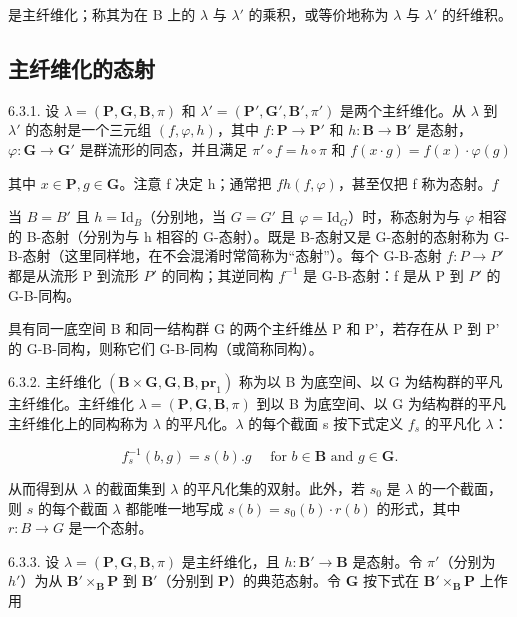 是主纤维化；称其为在 B 上的 \(\lambda\) 与 \(\lambda'\) 的乘积，或等价地称为 \(\lambda\) 与 \(\lambda'\) 的纤维积。

\subsection{主纤维化的态射}

6.3.1. 设 \(\lambda = (\mathbf{P}, \mathbf{G}, \mathbf{B}, \pi)\) 和 \(\lambda' = (\mathbf{P}', \mathbf{G}', \mathbf{B}', \pi')\) 是两个主纤维化。从 \(\lambda\) 到 \(\lambda'\) 的态射是一个三元组 \((f, \varphi, h)\)，其中 \(f: \mathbf{P} \to \mathbf{P}'\) 和 \(h: \mathbf{B} \to \mathbf{B}'\) 是态射，\(\varphi: \mathbf{G} \to \mathbf{G}'\) 是群流形的同态，并且满足 \(\pi' \circ f = h \circ \pi\) 和 \(f(x \cdot g) = f(x) \cdot \varphi(g)\)

其中 \(x \in \mathbf{P}, g \in \mathbf{G}\)。注意 f 决定 h；通常把 \(f\)\(h\)\((f, \varphi)\)，甚至仅把 f 称为态射。\(f\)

当 \(B = B'\) 且 \(h = \mathrm{Id}_{B}\)（分别地，当 \(G = G'\) 且 \(\varphi = \mathrm{Id}_{G}\)）时，称态射为与 \(\varphi\) 相容的 B-态射（分别为与 h 相容的 G-态射）。既是 B-态射又是 G-态射的态射称为 G-B-态射（这里同样地，在不会混淆时常简称为“态射”）。每个 G-B-态射 \(f : P \to P'\) 都是从流形 P 到流形 \(P'\) 的同构；其逆同构 \(f^{-1}\) 是 G-B-态射：f 是从 P 到 \(P'\) 的 G-B-同构。

具有同一底空间 B 和同一结构群 G 的两个主纤维丛 P 和 P'，若存在从 P 到 P' 的 G-B-同构，则称它们 G-B-同构（或简称同构）。

6.3.2. 主纤维化 \((\mathbf{B} \times \mathbf{G}, \mathbf{G}, \mathbf{B}, \mathbf{pr}_{1})\) 称为以 B 为底空间、以 G 为结构群的平凡主纤维化。主纤维化 \(\lambda = (\mathbf{P}, \mathbf{G}, \mathbf{B}, \pi)\) 到以 B 为底空间、以 G 为结构群的平凡主纤维化上的同构称为 \(\lambda\) 的平凡化。\(\lambda\) 的每个截面 s 按下式定义 \(f_{s}\) 的平凡化 \(\lambda\)：

\[
f _ {s} ^ {- 1} (b, g) = s (b). g \quad \text {   for   } b \in \mathbf {B} \text {   and   } g \in \mathbf {G}.
\]

从而得到从 \(\lambda\) 的截面集到 \(\lambda\) 的平凡化集的双射。此外，若 \(s_0\) 是 \(\lambda\) 的一个截面，则 \(s\) 的每个截面 \(\lambda\) 都能唯一地写成 \(s(b) = s_0(b) \cdot r(b)\) 的形式，其中 \(r: B \to G\) 是一个态射。

6.3.3. 设 \(\lambda = (\mathbf{P}, \mathbf{G}, \mathbf{B}, \pi)\) 是主纤维化，且 \(h: \mathbf{B}' \to \mathbf{B}\) 是态射。令 \(\pi'\)（分别为 \(h'\)）为从 \(\mathbf{B}' \times_{\mathbf{B}} \mathbf{P}\) 到 \(\mathbf{B}'\)（分别到 \(\mathbf{P}\)）的典范态射。令 \(\mathbf{G}\) 按下式在 \(\mathbf{B}' \times_{\mathbf{B}} \mathbf{P}\) 上作用

